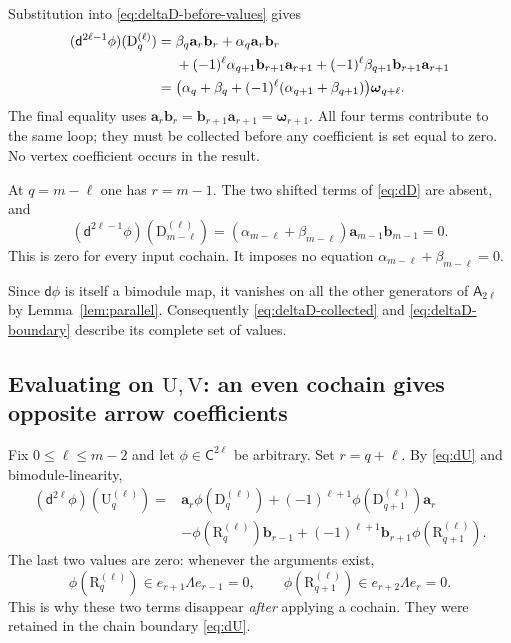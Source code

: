\documentclass[a4paper,11pt,oneside,reqno]{amsart}
\theoremstyle{definition}
\numberwithin{equation}{section}
\begin{document}
	Substitution into \eqref{eq:deltaD-before-values} gives
	\begin{align}
		(\mathsf d^{2\ell-1}\phi)(\mathrm{D}_q^{(\ell)})
		={}&\beta_q \mathbf{a}_r\mathbf{b}_r+\alpha_q \mathbf{a}_r\mathbf{b}_r\notag\\
		&+(-1)^\ell\alpha_{q+1}\mathbf{b}_{r+1}\mathbf{a}_{r+1}
		+(-1)^\ell\beta_{q+1}\mathbf{b}_{r+1}\mathbf{a}_{r+1}\notag\\
		={}&\bigl(\alpha_q+\beta_q
		+(-1)^\ell(\alpha_{q+1}+\beta_{q+1})\bigr)\boldsymbol{\omega}_{q+\ell}.
		\label{eq:deltaD-collected}
	\end{align}
	The final equality uses
	$\mathbf{a}_r\mathbf{b}_r=\mathbf{b}_{r+1}\mathbf{a}_{r+1}=\boldsymbol{\omega}_{r+1}$.
	All four terms contribute to the same loop; they must be collected
	before any coefficient is set equal to zero.  No vertex coefficient
	occurs in the result.
	
	At $q=m-\ell$ one has $r=m-1$.  The two shifted terms of
	\eqref{eq:dD} are absent, and
	\begin{equation}\label{eq:deltaD-boundary}
		(\mathsf d^{2\ell-1}\phi)(\mathrm{D}_{m-\ell}^{(\ell)})
		=(\alpha_{m-\ell}+\beta_{m-\ell})\mathbf{a}_{m-1}\mathbf{b}_{m-1}=0.
	\end{equation}
	This is zero for every input cochain.  It imposes no equation
	$\alpha_{m-\ell}+\beta_{m-\ell}=0$.
	
	Since $\mathsf d\phi$ is itself a bimodule map, it vanishes on all the
	other generators of $\mathsf A_{2\ell}$ by Lemma~\ref{lem:parallel}.
	Consequently \eqref{eq:deltaD-collected} and
	\eqref{eq:deltaD-boundary} describe its complete set of values.
	
	\subsection{Evaluating on \texorpdfstring{$\mathrm{U},\mathrm{V}$}{U,V}: an even cochain gives opposite arrow coefficients}
	\label{subsec:even-to-odd}
	
	Fix $0\leq\ell\leq m-2$ and let $\phi\in \mathsf C^{2\ell}$ be arbitrary.
	Set $r=q+\ell$.  By \eqref{eq:dU} and bimodule-linearity,
	\begin{equation}\label{eq:deltaU-full}
		\begin{aligned}
			(\mathsf d^{2\ell}\phi)(\mathrm{U}_q^{(\ell)})
			={}&\mathbf{a}_r\phi(\mathrm{D}_q^{(\ell)})
			+(-1)^{\ell+1}\phi(\mathrm{D}_{q+1}^{(\ell)})\mathbf{a}_r\\
			&-\phi(\mathrm{R}_q^{(\ell)})\mathbf{b}_{r-1}
			+(-1)^{\ell+1}\mathbf{b}_{r+1}\phi(\mathrm{R}_{q+1}^{(\ell)}).
		\end{aligned}
	\end{equation}
	The last two values are zero: whenever the arguments exist,
	\[
	\phi(\mathrm{R}_q^{(\ell)})
	\in e_{r+1}\Lambda e_{r-1}=0,
	\qquad
	\phi(\mathrm{R}_{q+1}^{(\ell)})
	\in e_{r+2}\Lambda e_r=0.
	\]
	This is why these two terms disappear \emph{after} applying a cochain.
	They were retained in the chain boundary \eqref{eq:dU}.
	
\end{document}
